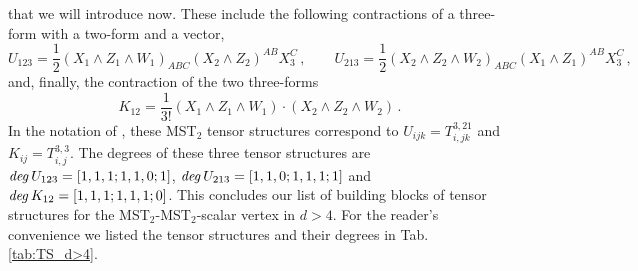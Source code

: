 \documentclass{article}
\begin{document}
that we will introduce now. These include the following contractions of a three-form with a two-form 
and a vector,
\begin{equation} \label{eq:Udef} 
    U_{123}=\frac{1}{2}(X_1\wedge Z_1\wedge W_1)_{ABC}(X_2\wedge Z_2)^{AB}X_3^{C}\,, \qquad U_{213}=\frac{1}{2}(X_2\wedge Z_2\wedge W_2)_{ABC}(X_1\wedge Z_1)^{AB}X_3^{C}\,,
\end{equation}
and, finally, the contraction of the two three-forms
\begin{equation}
    K_{12}=\frac{1}{3!}(X_1\wedge Z_1\wedge W_1)\cdot (X_2\wedge Z_2\wedge W_2)\,.
    \label{Kappaonetwo}
\end{equation}
In the notation of \cite{Lauria:2018klo}, these MST$_2$ tensor structures correspond to $U_{ijk} = T_{i,jk}^{3,21}$ and $K_{ij} = T_{i,j}^{3,3}$. The degrees of these three tensor structures are $\textit{deg\/}\,U_{123} = [1,1,1;1,1,0;1]$, 
$\textit{deg\/}\, U_{213} = [1,1,0;1,1,1;1]$ and $\textit{deg\/}\,K_{12} = [1,1,1;1,1,1;0]$.
This concludes our list of building blocks of tensor structures for the MST$_2$-MST$_2$-scalar vertex in $d>4$. For the reader's convenience we listed the tensor structures and their degrees in Tab. \ref{tab:TS_d>4}.
\smallskip 
\end{document}
